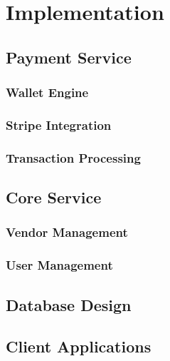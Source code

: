 \chapter{Implementation}
\label{chap:implementation}


\section{Payment Service}
\label{sec:payment-service}

\subsection{Wallet Engine}
\label{subsec:wallet-engine}

\subsection{Stripe Integration}
\label{subsec:stripe-integration}

\subsection{Transaction Processing}
\label{subsec:transaction-processing}

\section{Core Service}
\label{sec:core-service}

\subsection{Vendor Management}
\label{subsec:vendor-management}

\subsection{User Management}
\label{subsec:user-management}

\section{Database Design}
\label{sec:database-design}

\section{Client Applications}
\label{sec:client-apps}

